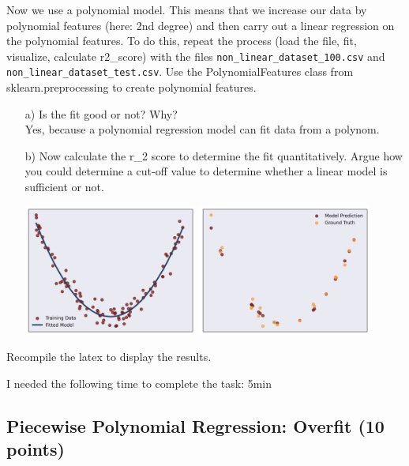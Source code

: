 Now we use a polynomial model. This means that we increase our data by polynomial features (here: 2nd degree) and then carry out a linear regression on the
polynomial features. To do this, repeat the process (load the file, fit, visualize, calculate r2\_score) with the files \texttt{non\_linear\_dataset\_100.csv} and \texttt{non\_linear\_dataset\_test.csv}.
Use the PolynomialFeatures class from sklearn.preprocessing to create polynomial features. 

\begin{enumerate}

\item[a)] Is the fit good or not? Why? \\
Yes, because a polynomial regression model can fit data from a polynom.

\item[b)] Now calculate the r\_2 score to determine the fit quantitatively. Argue how you could determine a cut-off value to determine whether a linear model is sufficient or not.

\includegraphics[width=0.45\textwidth]{source_code/goodfit_polynomial_model.png}
\includegraphics[width=0.45\textwidth]{source_code/goodfit_polynomial_testdata.png}

\end{enumerate}

Recompile the latex to display the results.

I needed the following time to complete the task: 5min

\subsection{Piecewise Polynomial Regression: Overfit (10 points)}

